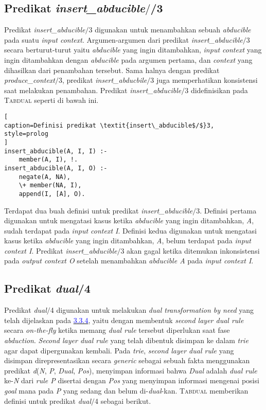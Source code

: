 \subsection{Predikat \textit{insert\_abducible$/$}/3}

Predikat \textit{insert\_abducible$/$}3 digunakan untuk menambahkan sebuah \textit{abducible} pada suatu \textit{input context}. Argumen-argumen dari predikat \textit{insert\_abducible$/$}3 secara berturut-turut yaitu \textit{abducible} yang ingin ditambahkan, \textit{input context} yang ingin ditambahkan dengan \textit{abducible} pada argumen pertama, dan \textit{context} yang dihasilkan dari penambahan tersebut. Sama halnya dengan predikat \textit{produce\_context$/$}3, predikat \textit{insert\_abducbile$/$}3 juga memperhatikan konsistensi saat melakukan penambahan. Predikat \textit{insert\_abducible$/$}3 didefinisikan pada \textsc{Tabdual} seperti di bawah ini.
\\

\begin{lstlisting}[
caption=Definisi predikat \textit{insert\_abducible$/$}3,
style=prolog
]
insert_abducible(A, I, I) :-
	member(A, I), !.
insert_abducible(A, I, O) :-
	negate(A, NA),
	\+ member(NA, I),
	append(I, [A], O).
\end{lstlisting}

Terdapat dua buah definisi untuk predikat \textit{insert\_abducible$/$}3. Definisi pertama digunakan untuk mengatasi kasus ketika \textit{abducible} yang ingin ditambahkan, \textit{A}, sudah terdapat pada \textit{input context I}. Definisi kedua digunakan untuk mengatasi kasus ketika \textit{abducible} yang ingin ditambahkan, \textit{A}, belum terdapat pada \textit{input context I}. Predikat \textit{insert\_abducible$/$}3 akan gagal ketika ditemukan inkonsistensi pada \textit{output context O} setelah menambahkan \textit{abducible A} pada \textit{input context I}.

\subsection{Predikat \textit{dual}/4}

Predikat \textit{dual$/$}4 digunakan untuk melakukan \textit{dual transformation by need} yang telah dijelaskan pada \hyperref[dualbyeed]{\textcolor{blue}{3.3.4}}, yaitu dengan membentuk \textit{second layer dual rule} secara \textit{on-the-fly} ketika memang \textit{dual rule} tersebut diperlukan saat fase \textit{abduction}. \textit{Second layer dual rule} yang telah dibentuk disimpan ke dalam \textit{trie} agar dapat dipergunakan kembali. Pada \textit{trie}, \textit{second layer dual rule} yang disimpan direpresentasikan secara \textit{generic} sebagai sebuah fakta menggunakan predikat \textit{d}(\textit{N}, \textit{P}, \textit{Dual}, \textit{Pos}), menyimpan informasi bahwa \textit{Dual} adalah \textit{dual rule} ke-\textit{N} dari \textit{rule P} disertai dengan \textit{Pos} yang menyimpan informasi mengenai posisi \textit{goal} mana pada \textit{P} yang sedang dan belum di-\textit{dual}-kan. \textsc{Tabdual} memberikan definisi untuk predikat \textit{dual$/$}4 sebagai berikut.
\\

